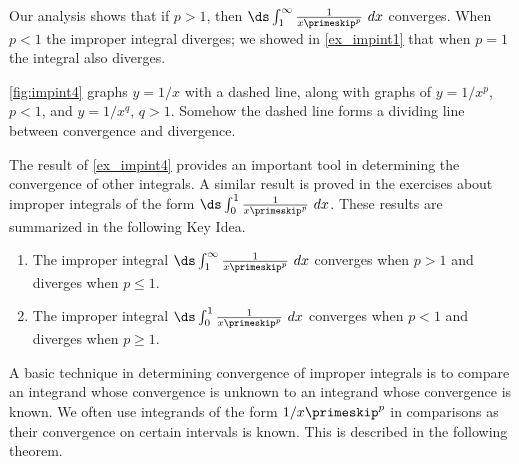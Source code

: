 \begin{example}
Our analysis shows that if $p>1$, then $\ds\int_1^\infty \frac1{x\primeskip^p}\ dx $ converges. When $p<1$ the improper integral diverges; we showed in \autoref{ex_impint1} that when $p=1$ the integral also diverges. 

\autoref{fig:impint4} graphs $y=1/x$ with a dashed line, along with graphs of $y=1/x^p$, $p<1$, and $y=1/x^q$, $q>1$. Somehow the dashed line forms a dividing line between convergence and divergence. %
\end{example}

The result of \autoref{ex_impint4} provides an important tool in determining the convergence of other integrals. A similar result is proved in the exercises about improper integrals of the form $\ds \int_0^1\frac1{x\primeskip^p}\ dx$. These results are summarized in the following Key Idea.

{
\begin{keyidea}\label{idea:impint1}
\begin{enumerate}
\item		The improper integral $\ds \int_1^\infty\frac1{x\primeskip^p}\ dx$ converges when $p>1$ and diverges when $p\leq 1.$
\item		The improper integral $\ds \int_0^1\frac1{x\primeskip^p}\ dx$ converges when $p<1$ and diverges when $p\geq 1.$
\end{enumerate}
\end{keyidea}
}

A basic technique in determining convergence of improper integrals is to compare an integrand whose convergence is unknown to an integrand whose convergence is known. We often use integrands of the form $1/x\primeskip^p$ in comparisons as their convergence on certain intervals is known. This is described in the following theorem.


